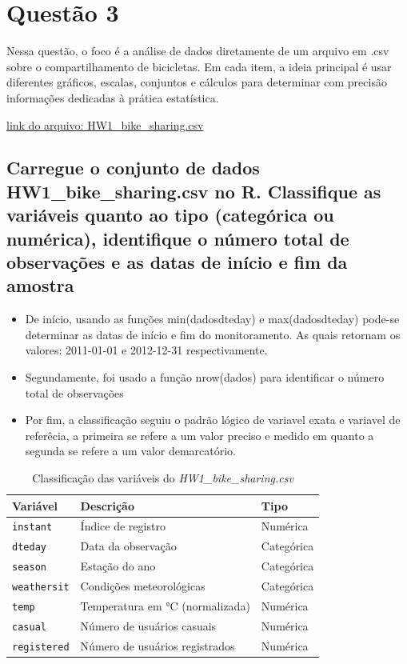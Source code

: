 \documentclass[12pt,a4paper]{article}
\begin{document}
\section{Questão 3}

Nessa questão, o foco é a análise de dados diretamente de um arquivo em .csv sobre o compartilhamento de bicicletas. Em cada item, a ideia principal é usar diferentes gráficos, escalas, conjuntos e cálculos para determinar com precisão informações dedicadas à prática estatística.


\href{https://raw.githubusercontent.com/JOAO-PEDRO-ROLIM-XIMENES/homework-da-mimi/refs/heads/main/HW1_bike_sharing.csv}{link do arquivo: HW1\_bike\_sharing.csv}
\subsection{Carregue o conjunto de dados HW1\_bike\_sharing.csv no R. Classifique as variáveis
 quanto ao tipo (categórica ou numérica), identifique o número total de observações
 e as datas de início e fim da amostra }
 
 
 \begin{itemize}
    \item De início, usando as funções min(dadosdteday) e max(dadosdteday) pode-se determinar as datas de início e fim do monitoramento. As quais retornam os valores:  2011-01-01 e 2012-12-31 respectivamente.
    \item Segundamente, foi usado a função nrow(dados) para identificar o número total de observações
    \item Por fim, a classificação seguiu o padrão lógico de variavel exata e variavel de referêcia, a primeira se refere a um valor preciso e medido em quanto a segunda se refere a um valor demarcatório.
    
    
    
\end{itemize}
\begin{table}[H]
\centering
\caption{Classificação das variáveis do \textit{HW1\_bike\_sharing.csv}}
\label{tab:variaveis}
\begin{tabular}{lll}
\toprule
\textbf{Variável} & \textbf{Descrição} & \textbf{Tipo} \\ 
\midrule
\texttt{instant} & Índice de registro & Numérica \\ 
\texttt{dteday} & Data da observação & Categórica \\ 
\texttt{season} & Estação do ano & Categórica \\ 
\texttt{weathersit} & Condições meteorológicas & Categórica \\ 
\texttt{temp} & Temperatura em °C (normalizada) & Numérica \\  
\texttt{casual} & Número de usuários casuais & Numérica  \\ 
\texttt{registered} & Número de usuários registrados & Numérica \\ 
\bottomrule
\end{tabular}
\end{table}
\end{document}

